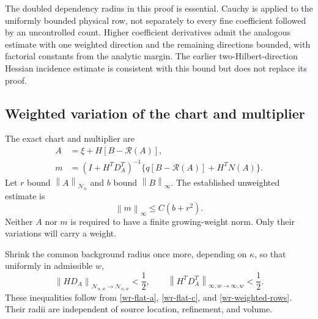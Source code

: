 \documentclass[11pt]{article}
\theoremstyle{remark}
\newcommand{\norm}[1]{\left\|#1\right\|}
\begin{document}
The doubled dependency radius in this proof is essential.
Cauchy is applied to the uniformly bounded physical row, not
separately to every fine coefficient followed by an uncontrolled
count. Higher coefficient derivatives admit the analogous estimate
with one weighted direction and the remaining directions bounded,
with factorial constants from the analytic margin. The earlier
two-Hilbert-direction Hessian incidence estimate is consistent
with this bound but does not replace its proof.

\subsection{Weighted variation of the chart and multiplier}
\label{wr-variation}

The exact chart and multiplier are
\begin{equation}\label{wr-chart-multiplier}
 \begin{split}
 A&=\xi+H[B-\mathcal R(A)],\\
 m&=(I+H^TD_A^T)^{-1}
             \{q[B-\mathcal R(A)]+H^TN(A)\}.
 \end{split}
\end{equation}
Let $r$ bound $\norm{A}_{\mathcal N_\alpha}$ and $b$ bound
$\norm{B}_\infty$. The established unweighted estimate is
\begin{equation}\label{wr-background-multiplier}
 \norm{m}_\infty\le C(b+r^2).
\end{equation}
Neither $A$ nor $m$ is required to have a finite growing-weight
norm. Only their variations will carry a weight.

Shrink the common background radius once more, depending on
$\kappa$, so that uniformly in admissible $w$,
\begin{equation}\label{wr-inverse-smallness}
 \norm{HD_A}_{\mathcal N_{\alpha,w}\to\mathcal N_{\alpha,w}}<\frac12,
 \qquad
 \norm{H^TD_A^T}_{\infty,w\to\infty,w}<\frac12.
\end{equation}
These inequalities follow from \eqref{wr-flat-a},
\eqref{wr-flat-c}, and \eqref{wr-weighted-rows}. Their radii
are independent of source location, refinement, and volume.
\end{document}
